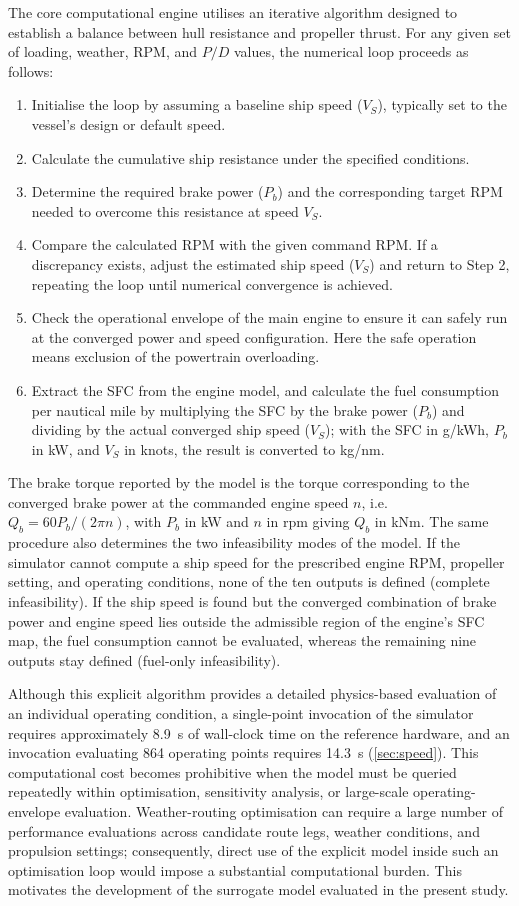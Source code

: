 \documentclass[final,5p,times,twocolumn,numbers]{elsarticle}
\begin{document}
The core computational engine utilises an iterative algorithm designed to establish a balance between hull resistance and propeller thrust. For any given set of loading, weather, RPM, and $P/D$ values, the numerical loop proceeds as follows:
\begin{enumerate}
\item Initialise the loop by assuming a baseline ship speed ($V_S$), typically set to the vessel's design or default speed.
\item Calculate the cumulative ship resistance under the specified conditions.
\item Determine the required brake power ($P_b$) and the corresponding target RPM needed to overcome this resistance at speed $V_S$.
\item Compare the calculated RPM with the given command RPM. If a discrepancy exists, adjust the estimated ship speed ($V_S$) and return to Step 2, repeating the loop until numerical convergence is achieved.
\item Check the operational envelope of the main engine to ensure it can safely run at the converged power and speed configuration. Here the safe operation means exclusion of the powertrain overloading.
\item Extract the SFC from the engine model, and calculate the fuel consumption per nautical mile by multiplying the SFC by the brake power ($P_b$) and dividing by the actual converged ship speed ($V_S$); with the SFC in g/kWh, $P_b$ in kW, and $V_S$ in knots, the result is converted to kg/nm.
\end{enumerate}

The brake torque reported by the model is the torque corresponding to the converged brake power at the commanded engine speed $n$, i.e.\ $Q_b = 60P_b/(2\pi n)$, with $P_b$ in kW and $n$ in rpm giving $Q_b$ in kNm. The same procedure also determines the two infeasibility modes of the model. If the simulator cannot compute a ship speed for the prescribed engine RPM, propeller setting, and operating conditions, none of the ten outputs is defined (complete infeasibility). If the ship speed is found but the converged combination of brake power and engine speed lies outside the admissible region of the engine's SFC map, the fuel consumption cannot be evaluated, whereas the remaining nine outputs stay defined (fuel-only infeasibility).

Although this explicit algorithm provides a detailed physics-based evaluation of an individual operating condition, a single-point invocation of the simulator requires approximately 8.9~s of wall-clock time on the reference hardware, and an invocation evaluating 864 operating points requires 14.3~s (\autoref{sec:speed}). This computational cost becomes prohibitive when the model must be queried repeatedly within optimisation, sensitivity analysis, or large-scale operating-envelope evaluation. Weather-routing optimisation can require a large number of performance evaluations across candidate route legs, weather conditions, and propulsion settings; consequently, direct use of the explicit model inside such an optimisation loop would impose a substantial computational burden. This motivates the development of the surrogate model evaluated in the present study.
\end{document}
